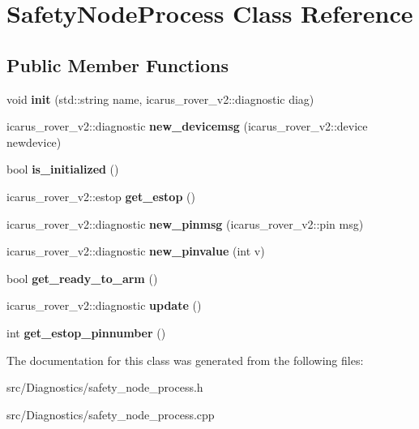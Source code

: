 \hypertarget{classSafetyNodeProcess}{}\section{Safety\+Node\+Process Class Reference}
\label{classSafetyNodeProcess}
\subsection*{Public Member Functions}
\begin{DoxyCompactItemize}
\item 
\mbox{\label{classSafetyNodeProcess_a616ae0f55f219e49c1834089ff9718c9}} 
void {\bfseries init} (std\+::string name, icarus\+\_\+rover\+\_\+v2\+::diagnostic diag)
\item 
\mbox{\label{classSafetyNodeProcess_a80b36227046a39cdf427e6ed488969b5}} 
icarus\+\_\+rover\+\_\+v2\+::diagnostic {\bfseries new\+\_\+devicemsg} (icarus\+\_\+rover\+\_\+v2\+::device newdevice)
\item 
\mbox{\label{classSafetyNodeProcess_af337f39cba6a7f3745fbd4f46c64780b}} 
bool {\bfseries is\+\_\+initialized} ()
\item 
\mbox{\label{classSafetyNodeProcess_a7c19e0bbb3b2bbb6d9fe9edf325889a2}} 
icarus\+\_\+rover\+\_\+v2\+::estop {\bfseries get\+\_\+estop} ()
\item 
\mbox{\label{classSafetyNodeProcess_a298d50dc51dfd18182ced1e958a23fc2}} 
icarus\+\_\+rover\+\_\+v2\+::diagnostic {\bfseries new\+\_\+pinmsg} (icarus\+\_\+rover\+\_\+v2\+::pin msg)
\item 
\mbox{\label{classSafetyNodeProcess_ac43a666cc716d238e418775b638e3dbc}} 
icarus\+\_\+rover\+\_\+v2\+::diagnostic {\bfseries new\+\_\+pinvalue} (int v)
\item 
\mbox{\label{classSafetyNodeProcess_aeebb911a61a2fb56b91e50d29afb1233}} 
bool {\bfseries get\+\_\+ready\+\_\+to\+\_\+arm} ()
\item 
\mbox{\label{classSafetyNodeProcess_a72ba8f8009255b0ac2789ca6a3169e91}} 
icarus\+\_\+rover\+\_\+v2\+::diagnostic {\bfseries update} ()
\item 
\mbox{\label{classSafetyNodeProcess_aa3adab0f2469f866eea90de6d4d192a9}} 
int {\bfseries get\+\_\+estop\+\_\+pinnumber} ()
\end{DoxyCompactItemize}


The documentation for this class was generated from the following files\+:\begin{DoxyCompactItemize}
\item 
src/\+Diagnostics/safety\+\_\+node\+\_\+process.\+h\item 
src/\+Diagnostics/safety\+\_\+node\+\_\+process.\+cpp\end{DoxyCompactItemize}
